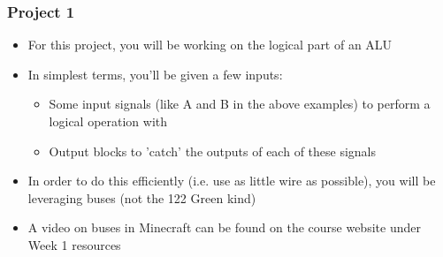 \documentclass{beamer}
\begin{document}
      	\begin{frame}
      		\frametitle{Project 1}
      		\begin{itemize}
      			\item For this project, you will be working on the logical part of an ALU
      			\item In simplest terms, you'll be given a few inputs:
      			\begin{itemize}
      				\item Some input signals (like A and B in the above examples) to perform a logical operation with
      				\item Output blocks to 'catch' the outputs of each of these signals
      			\end{itemize}
      			\item In order to do this efficiently (i.e. use as little wire as possible), you will be leveraging buses (not the 122 Green kind)
      			\item A video on buses in Minecraft can be found on the course website under Week 1 resources
      		\end{itemize}
      	\end{frame}
            
    
    
\end{document}

